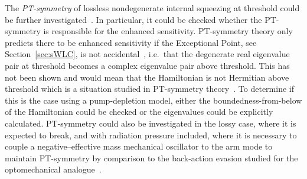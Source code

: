 The \emph{PT-symmetry} of lossless nondegenerate internal squeezing at threshold could be further investigated~\cite{CMBPersonalCommunication}. In particular, it could be checked whether the PT-symmetry is responsible for the enhanced sensitivity.
PT-symmetry theory only predicts there to be enhanced sensitivity if the Exceptional Point, see Section~\ref{sec:sWLC}, is not accidental~\cite{liu2016metrology,hodaei2017enhanced}, i.e.\ that the degenerate real eigenvalue pair at threshold becomes a complex eigenvalue pair above threshold. This has not been shown and would mean that the Hamiltonian is not Hermitian above threshold which is a situation studied in PT-symmetry theory~\cite{el2018non}. To determine if this is the case using a pump-depletion model, either the boundedness-from-below of the Hamiltonian could be checked or the eigenvalues could be explicitly calculated.
PT-symmetry could also be investigated in the lossy case, where it is expected to break, and with radiation pressure included, where it is necessary to couple a negative--effective mass mechanical oscillator to the arm mode to maintain PT-symmetry by comparison to the back-action evasion studied for the optomechanical analogue~\cite{liBroadbandSensitivityImprovement2020}.


